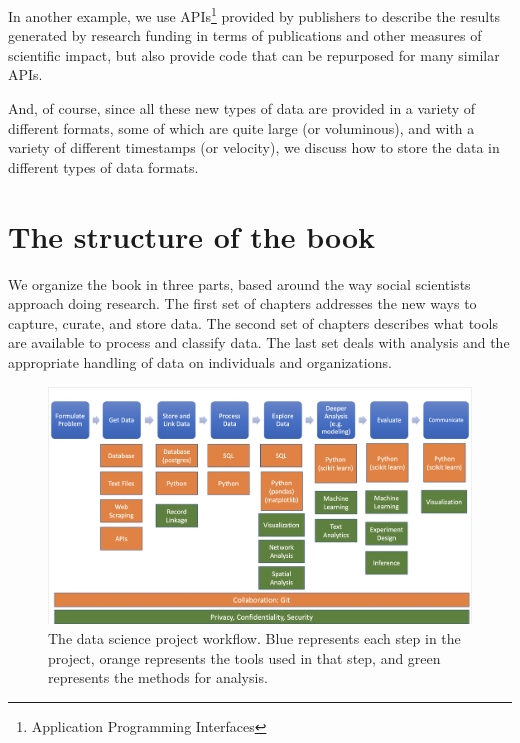 \documentclass[]{krantz}
\begin{document}
In another example, we use APIs\footnote{Application Programming
  Interfaces} provided by publishers to describe the results generated
by research funding in terms of publications and other measures of
scientific impact, but also provide code that can be repurposed for many
similar APIs.

And, of course, since all these new types of data are provided in a
variety of different formats, some of which are quite large (or
voluminous), and with a variety of different timestamps (or velocity),
we discuss how to store the data in different types of data formats.

\section{The structure of the book}\label{the-structure-of-the-book}

We organize the book in three parts, based around the way social
scientists approach doing research. The first set of chapters addresses
the new ways to capture, curate, and store data. The second set of
chapters describes what tools are available to process and classify
data. The last set deals with analysis and the appropriate handling of
data on individuals and organizations.

\begin{figure}

{\centering \includegraphics[width=1\linewidth]{ChapterIntro/figures/projectflow} 

}

\caption{The data science project workflow. Blue represents each step in the project, orange represents the tools used in that step, and green represents the methods for analysis.}\label{fig:projectfig}
\end{figure}
\end{document}
